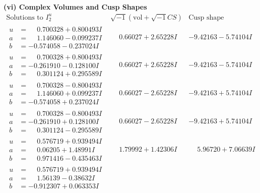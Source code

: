 \documentclass[1p]{elsarticle_modified}
\theoremstyle{definition}
\newcommand{\I}{\sqrt{-1}}
\begin{document}
\newpage\flushleft \textbf{(vi) Complex Volumes and Cusp Shapes}
$$\begin{array}{c|c|c}  
\text{Solutions to }I^u_{2}& \I (\text{vol} + \sqrt{-1}CS) & \text{Cusp shape}\\
 \hline 
\begin{aligned}
u &= \phantom{-}0.700328 + 0.800493 I \\
a &= \phantom{-}1.146060 - 0.099237 I \\
b &= -0.574058 - 0.237024 I\end{aligned}
 & \phantom{-}0.66027 + 2.65228 I & -9.42163 - 5.74104 I \\ \hline\begin{aligned}
u &= \phantom{-}0.700328 + 0.800493 I \\
a &= -0.261910 - 0.128100 I \\
b &= \phantom{-}0.301124 + 0.295589 I\end{aligned}
 & \phantom{-}0.66027 + 2.65228 I & -9.42163 - 5.74104 I \\ \hline\begin{aligned}
u &= \phantom{-}0.700328 - 0.800493 I \\
a &= \phantom{-}1.146060 + 0.099237 I \\
b &= -0.574058 + 0.237024 I\end{aligned}
 & \phantom{-}0.66027 - 2.65228 I & -9.42163 + 5.74104 I \\ \hline\begin{aligned}
u &= \phantom{-}0.700328 - 0.800493 I \\
a &= -0.261910 + 0.128100 I \\
b &= \phantom{-}0.301124 - 0.295589 I\end{aligned}
 & \phantom{-}0.66027 - 2.65228 I & -9.42163 + 5.74104 I \\ \hline\begin{aligned}
u &= \phantom{-}0.576719 + 0.939494 I \\
a &= \phantom{-}0.06205 + 1.48991 I \\
b &= \phantom{-}0.971416 - 0.435463 I\end{aligned}
 & \phantom{-}1.79992 + 1.42306 I & \phantom{-}5.96720 + 7.06639 I \\ \hline\begin{aligned}
u &= \phantom{-}0.576719 + 0.939494 I \\
a &= \phantom{-}1.56139 - 0.38632 I \\
b &= -0.912307 + 0.063353 I\end{aligned}

\end{array}$$
\end{document}
